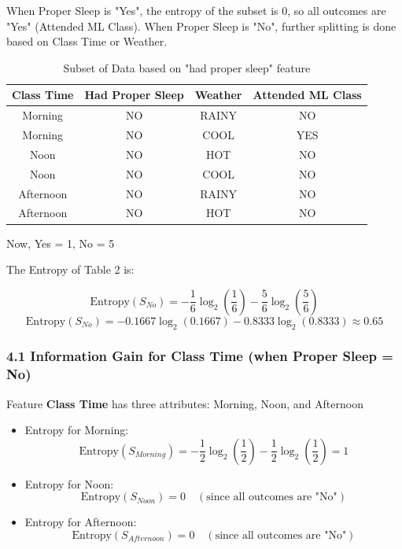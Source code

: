 \documentclass{article}
\begin{document}
When Proper Sleep is "Yes", the entropy of the subset is 0, so all outcomes are "Yes" (Attended ML Class). When Proper Sleep is "No", further splitting is done based on Class Time or Weather.

\begin{table}[H]
    \centering
    \begin{tabular}{|c|c|c|c|}
    \hline
    \textbf{Class Time} & \textbf{Had Proper Sleep} & \textbf{Weather} & \textbf{Attended ML Class} \\ \hline
    Morning & NO & RAINY & NO \\ \hline
    Morning & NO & COOL & YES \\ \hline
    Noon & NO & HOT & NO \\ \hline
    Noon & NO & COOL & NO \\ \hline
    Afternoon & NO & RAINY & NO \\ \hline
    Afternoon & NO & HOT & NO \\ \hline
    \end{tabular}
    \caption{Subset of Data based on "had proper sleep" feature}
\end{table}

Now,
Yes = 1, No = 5

The Entropy of Table 2 is:

\[
\text{Entropy}(S_{No}) = -\frac{1}{6} \log_2\left(\frac{1}{6}\right) - \frac{5}{6} \log_2\left(\frac{5}{6}\right)
\]
\[
\text{Entropy}(S_{No}) = -0.1667 \log_2(0.1667) - 0.8333 \log_2(0.8333) \approx 0.65
\]

\subsubsection*{4.1 Information Gain for Class Time (when Proper Sleep = No)}
Feature \textbf{Class Time} has three attributes: Morning, Noon, and Afternoon

\begin{itemize}
\item Entropy for Morning: 
\[
\text{Entropy}(S_{Morning}) = -\frac{1}{2} \log_2\left(\frac{1}{2}\right) - \frac{1}{2} \log_2\left(\frac{1}{2}\right) = 1
\]

\item Entropy for Noon: 
\[
\text{Entropy}(S_{Noon}) = 0 \quad (\text{since all outcomes are "No"})
\]

\item Entropy for Afternoon: 
\[
\text{Entropy}(S_{Afternoon}) = 0 \quad (\text{since all outcomes are "No"})
\]
\end{itemize}
\end{document}
